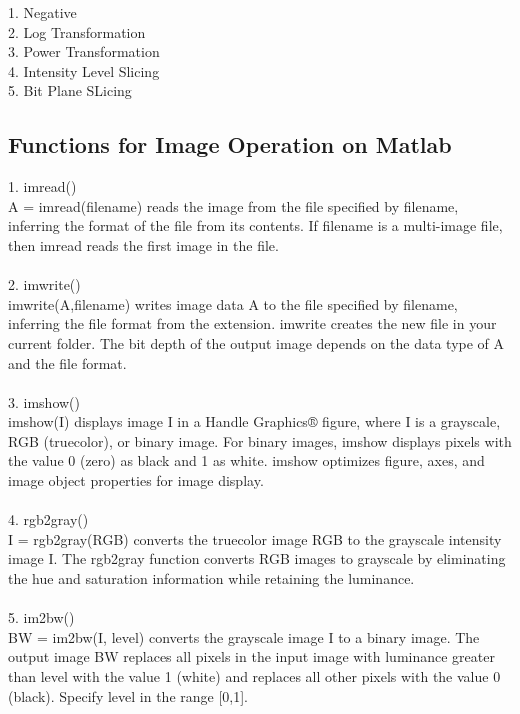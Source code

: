\documentclass[12pt]{article}
\begin{document}
1. Negative\\
2. Log Transformation\\
3. Power Transformation\\
4. Intensity Level Slicing\\
5. Bit Plane SLicing\\

\subsection{Functions for Image Operation on Matlab}
1. imread()\\
A = imread(filename) reads the image from the file specified by filename, inferring the format of the file from its contents. If filename is a multi-image file, then imread reads the first image in the file.\\\\
2. imwrite()\\
imwrite(A,filename) writes image data A to the file specified by filename, inferring the file format from the extension. imwrite creates the new file in your current folder. The bit depth of the output image depends on the data type of A and the file format.\\\\
3. imshow()\\
imshow(I) displays image I in a Handle Graphics® figure, where I is a grayscale, RGB (truecolor), or binary image. For binary images, imshow displays pixels with the value 0 (zero) as black and 1 as white. imshow optimizes figure, axes, and image object properties for image display.\\\\
4. rgb2gray()\\
I = rgb2gray(RGB) converts the truecolor image RGB to the grayscale intensity image I. The rgb2gray function converts RGB images to grayscale by eliminating the hue and saturation information while retaining the luminance.\\\\
5. im2bw()\\
BW = im2bw(I, level) converts the grayscale image I to a binary image. The output image BW replaces all pixels in the input image with luminance greater than level with the value 1 (white) and replaces all other pixels with the value 0 (black). Specify level in the range [0,1]. \\\\

\pagebreak
\end{document}

